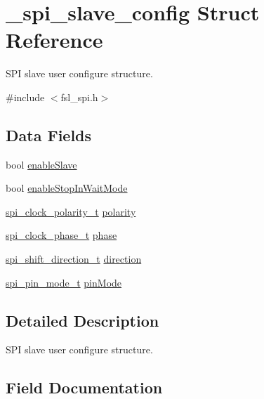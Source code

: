 \hypertarget{struct__spi__slave__config}{}\section{\+\_\+spi\+\_\+slave\+\_\+config Struct Reference}
\label{struct__spi__slave__config}


S\+PI slave user configure structure.  




{\ttfamily \#include $<$fsl\+\_\+spi.\+h$>$}

\subsection*{Data Fields}
\begin{DoxyCompactItemize}
\item 
bool \mbox{\hyperlink{struct__spi__slave__config_a9189d8f6438ba99548837da162213c46}{enable\+Slave}}
\item 
bool \mbox{\hyperlink{struct__spi__slave__config_a9b8027e0bd0a21915f56155fdc08c5fc}{enable\+Stop\+In\+Wait\+Mode}}
\item 
\mbox{\hyperlink{group__spi__driver_ga9de95ac02ae859ac26534c06eb47b5b8}{spi\+\_\+clock\+\_\+polarity\+\_\+t}} \mbox{\hyperlink{struct__spi__slave__config_ad5743b187f5dda0c1786a192ba11b043}{polarity}}
\item 
\mbox{\hyperlink{group__spi__driver_ga12e1c73dd72aaabd76ff5ce23c0d3244}{spi\+\_\+clock\+\_\+phase\+\_\+t}} \mbox{\hyperlink{struct__spi__slave__config_af7cf10baeb58ef18f8d18ef7022d43d8}{phase}}
\item 
\mbox{\hyperlink{group__spi__driver_gadc24bb931a59fc64ee4cb60ed56addb4}{spi\+\_\+shift\+\_\+direction\+\_\+t}} \mbox{\hyperlink{struct__spi__slave__config_ae8f40fc982ba997f08e6a1fe1fe8fd8c}{direction}}
\item 
\mbox{\hyperlink{group__spi__driver_ga4d2e20ceaf81868a429938113afe8726}{spi\+\_\+pin\+\_\+mode\+\_\+t}} \mbox{\hyperlink{struct__spi__slave__config_ab929baca49507045ca23069da9bbe3ba}{pin\+Mode}}
\end{DoxyCompactItemize}


\subsection{Detailed Description}
S\+PI slave user configure structure. 

\subsection{Field Documentation}
\mbox{\label{struct__spi__slave__config_ae8f40fc982ba997f08e6a1fe1fe8fd8c}} 
